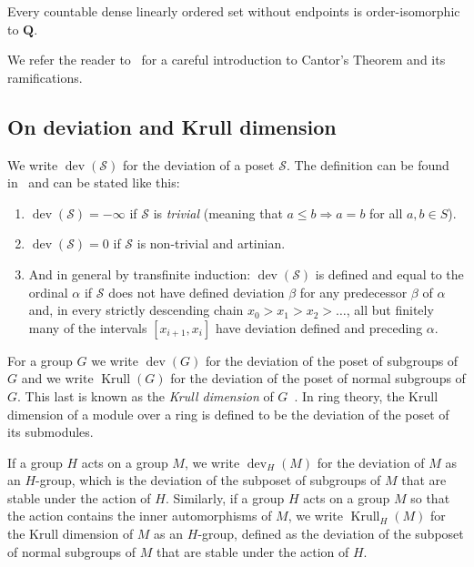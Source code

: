 \documentclass[11pt]{article}
\theoremstyle{definition}
\numberwithin{equation}{section}
\numberwithin{figure}{section}
\numberwithin{table}{section}
\renewcommand{\implies}{\Rightarrow}
\DeclareMathOperator{\dev}{dev}
\DeclareMathOperator{\krull}{Krull}
\newcommand*{\romanenumi}{\renewcommand*{\theenumi}{\roman{enumi}}}
\begin{document}
\begin{cantorstheorem}
Every countable dense linearly ordered set without endpoints is order-isomorphic to $\mathbf Q$.
\end{cantorstheorem}

We refer the reader to~\cite[Chapter~9]{perms} for a careful introduction to Cantor's Theorem and its ramifications.


\subsection{On deviation and Krull dimension}

We write $\dev(\mathcal S)$ for the deviation of a poset $\mathcal S$. The definition can be found in~\cite{MR} and can be stated like this:
\begin{enumerate}\romanenumi
\item \label{list2.3.1}$\dev(\mathcal S)=-\infty$ if $\mathcal S$ is \emph{trivial} (meaning that $a\le b\implies a=b$ for all $a,b\in S$).
\item \label{list2.3.2}$\dev(\mathcal S)=0$ if $\mathcal S$ is non-trivial and artinian.
\item \label{list2.3.3}And in general by transfinite induction: $\dev(\mathcal S)$ is defined and equal to the ordinal $\alpha$ if $\mathcal S$ does not have defined deviation $\beta$ for any predecessor $\beta$ of $\alpha$ and, in every strictly descending chain $x_0>x_1>x_2>\dots$, all but finitely many of the intervals $[x_{i+1},x_i] $ have deviation defined and preceding $\alpha$.
\end{enumerate}


For a group $G$ we write $\dev(G)$ for the deviation of the poset of subgroups of $G$ and we write $\krull(G)$ for the deviation of the poset of normal subgroups of $G$. This last is known as the \emph{Krull dimension} of $G$~\cite{Tus}. In ring theory, the Krull dimension of a module over a ring is defined to be the deviation of the poset of its submodules.

If a group $H$ acts on a group $M$, we write $\dev_H(M)$ for the deviation of $M$ as an $H$-group, which is the deviation of the subposet of subgroups of $M$ that are stable under the action of $H$. Similarly, if a group $H$ acts on a group $M$ so that the action contains the inner automorphisms of $M$, we write $\krull_H(M)$ for the Krull dimension of $M$ as an $H$-group, defined as the deviation of the subposet of normal subgroups of $M$ that are stable under the action of $H$.
\end{document}
